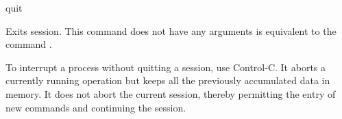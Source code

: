 \begin{command}{quit}{}
    
    \syntax{\obligatory{()}}
    
    \begin{poydescription}
        Exits \poy session. This command does not have any arguments
         is equivalent to the command .
    \end{poydescription}

    \begin{statement}
        To interrupt a process without quitting a \poy session, use Control-C.
        It aborts a currently running operation but keeps all the previously
        accumulated data in memory. It does not abort the current session, thereby
        permitting the entry of  new commands and continuing the session.
    \end{statement}

    \begin{poyexamples}
    \end{poyexamples}
    
    \begin{poyalso}
    \end{poyalso}
\end{command}



   
